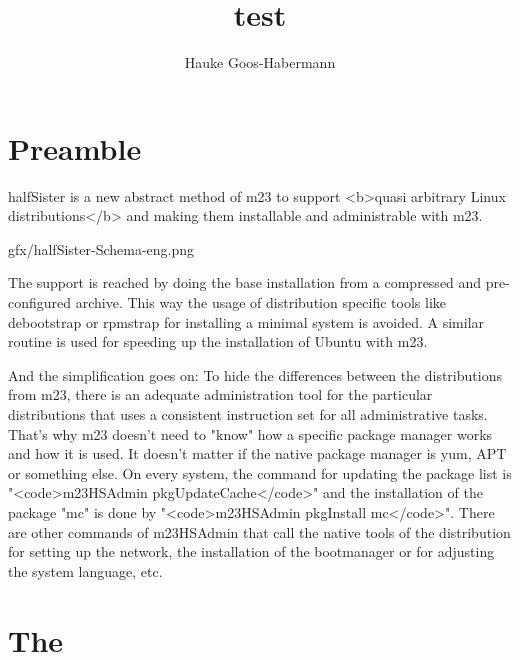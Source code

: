 \documentclass[a4paper,10pt]{article}
\title{test}
\author{Hauke Goos-Habermann}
\begin{document}
\maketitle

\section{Preamble}
halfSister is a new abstract method of m23 to support <b>quasi arbitrary Linux distributions</b> and making them installable and administrable with m23.

gfx/halfSister-Schema-eng.png

The support is reached by doing the base installation from a compressed and pre-configured archive. This way the usage of distribution specific tools like debootstrap or rpmstrap for installing a minimal system is avoided. A similar routine is used for speeding up the installation of Ubuntu with m23.

And the simplification goes on: To hide the differences between the distributions from m23, there is an adequate administration tool for the particular distributions that uses a consistent instruction set for all administrative tasks. That's why m23 doesn't need to "know" how  a specific package manager works and how it is used. It doesn't matter if the native package manager is yum, APT or something else. On every system, the command for updating the package list is "<code>m23HSAdmin pkgUpdateCache</code>" and the installation of the package "mc" is done by "<code>m23HSAdmin pkgInstall mc</code>". There are other commands of m23HSAdmin that call the native tools of the distribution for setting up the network, the installation of the bootmanager or for adjusting the system language, etc.


\section{The }
\end{document}
